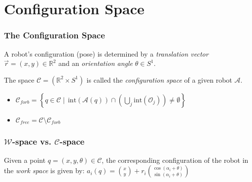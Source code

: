 \documentclass[ucs,9pt,pagenumbersfull]{beamer}
\begin{document}
\section{Configuration Space}
\begin{frame}
  \frametitle{The Configuration Space}
  A robot's configuration (pose) is determined by a \emph{translation vector} \(\vec{r}=(x,y) \in \mathbb{R}^2\) and an \emph{orientation angle} \(\theta\in S^1\).

  \begin{definition}
    The space \(\mathcal{C} = \left( \mathbb{R}^2 \times S^1 \right)\) is called the \emph{configuration space} of a given robot \(\mathcal{A}\).

    \begin{itemize}
    \item \(\mathcal{C}_{forb} = \left\{ q \in \mathcal{C} \mid \,
        \mathrm{int}(\mathcal{A}(q)) \cap \left(\bigcup_{j} \mathrm{int}(\mathcal{O}_j)\right) \neq
        \emptyset \right\} \)
    \item \(\mathcal{C}_{free}  = \mathcal{C} \setminus \mathcal{C}_{forb}\)
    \end{itemize}
  \end{definition}
\end{frame}

\begin{frame}
  \frametitle{\(\mathcal{W}\)-space vs. \(\mathcal{C}\)-space}
  Given a point \(q=\left(x,y,\theta\right)\in \mathcal{C}\), the
  corresponding configuration of the robot in the \emph{work space} is given by: %
  \(
  a_i(q) = \binom{x}{y}+r_i \binom{\cos(\alpha_i + \theta)}{\sin(\alpha_i+\theta)}
  \)

  \begin{figure}
    \centering
    
  \end{figure}
\end{frame}
\end{document}
